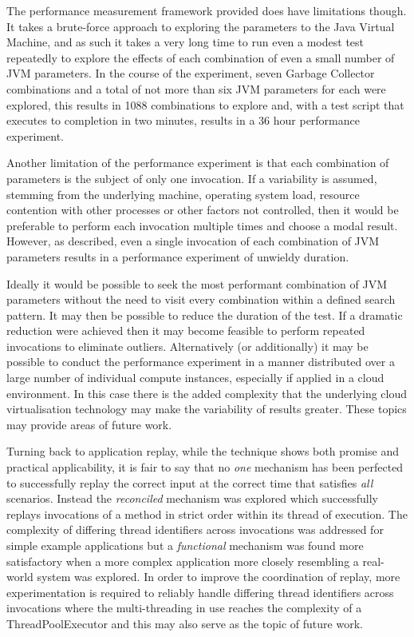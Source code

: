 \documentclass[]{final_report}
\begin{document}
The performance measurement framework provided does have limitations though. It takes a brute-force approach to exploring the parameters to the Java Virtual Machine, and as such it takes a very long time to run even a modest test repeatedly to explore the effects of each combination of even a small number of JVM parameters. In the course of the experiment, seven Garbage Collector combinations and a total of not more than six JVM parameters for each were explored, this results in 1088 combinations to explore and, with a test script that executes to completion in two minutes, results in a 36 hour performance experiment.

Another limitation of the performance experiment is that each combination of parameters is the subject of only one invocation. If a variability is assumed, stemming from the underlying machine, operating system load, resource contention with other processes or other factors not controlled, then it would be preferable to perform each invocation multiple times and choose a modal result. However, as described, even a single invocation of each combination of JVM parameters results in a performance experiment of unwieldy duration. 

Ideally it would be possible to seek the most performant combination of JVM parameters without the need to visit every combination within a defined search pattern. It may then be possible to reduce the duration of the test. If a dramatic reduction were achieved then it may become feasible to perform repeated invocations to eliminate outliers. Alternatively (or additionally) it may be possible to conduct the performance experiment in a manner distributed over a large number of individual compute instances, especially if applied in a cloud environment. In this case there is the added complexity that the underlying cloud virtualisation technology may make the variability of results greater. These topics may provide areas of future work.

Turning back to application replay, while the technique shows both promise and practical applicability, it is fair to say that no \textit{one} mechanism has been perfected to successfully replay the correct input at the correct time that satisfies \textit{all} scenarios. Instead the \textit{reconciled} mechanism was explored which successfully replays invocations of a method in strict order within its thread of execution. The complexity of differing thread identifiers across invocations was addressed for simple example applications but a \textit{functional} mechanism was found more satisfactory when a more complex application more closely resembling a real-world system was explored. In order to improve the coordination of replay, more experimentation is required to reliably handle differing thread identifiers across invocations where the multi-threading in use reaches the complexity of a ThreadPoolExecutor and this may also serve as the topic of future work.
\end{document}
